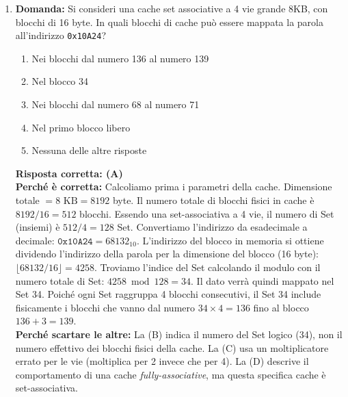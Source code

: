 \documentclass[12pt, a4paper]{article}
\begin{document}
\begin{enumerate}
    \item \textbf{Domanda:} Si consideri una cache set associative a 4 vie grande 8KB, con blocchi di 16 byte. In quali blocchi di cache può essere mappata la parola all'indirizzo \texttt{0x10A24}?
    \begin{enumerate}[label=(\Alph*)]
        \item Nei blocchi dal numero 136 al numero 139
        \item Nel blocco 34
        \item Nei blocchi dal numero 68 al numero 71
        \item Nel primo blocco libero
        \item Nessuna delle altre risposte
    \end{enumerate}
    \textbf{Risposta corretta: (A)} \\
    \textbf{Perché è corretta:} Calcoliamo prima i parametri della cache. Dimensione totale $= 8\text{ KB} = 8192$ byte. Il numero totale di blocchi fisici in cache è $8192 / 16 = 512$ blocchi. Essendo una set-associativa a 4 vie, il numero di Set (insiemi) è $512 / 4 = 128$ Set. 
    Convertiamo l'indirizzo da esadecimale a decimale: $\texttt{0x10A24} = 68132_{10}$. 
    L'indirizzo del blocco in memoria si ottiene dividendo l'indirizzo della parola per la dimensione del blocco (16 byte): $\lfloor 68132 / 16 \rfloor = 4258$. 
    Troviamo l'indice del Set calcolando il modulo con il numero totale di Set: $4258 \bmod 128 = 34$. 
    Il dato verrà quindi mappato nel Set 34. Poiché ogni Set raggruppa 4 blocchi consecutivi, il Set 34 include fisicamente i blocchi che vanno dal numero $34 \times 4 = 136$ fino al blocco $136 + 3 = 139$. \\
    \textbf{Perché scartare le altre:} La (B) indica il numero del Set logico (34), non il numero effettivo dei blocchi fisici della cache. La (C) usa un moltiplicatore errato per le vie (moltiplica per 2 invece che per 4). La (D) descrive il comportamento di una cache \textit{fully-associative}, ma questa specifica cache è set-associativa.


\end{enumerate}
\end{document}
